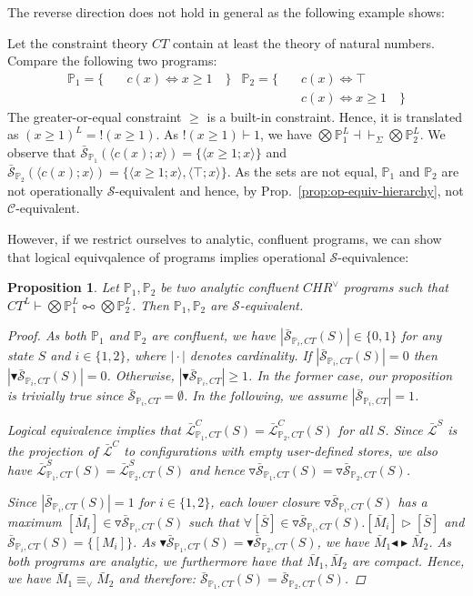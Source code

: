 \documentclass[acmtocl]{acmtrans2m}
\newtheorem{proposition}[theorem]{Proposition}
\newcommand\state[1]{\langle #1 \rangle}
\newcommand\ent{\rhd}
\renewcommand\sim{{\blacktriangleleft\blacktriangleright}}
\newcommand\equv{\equiv_\vee}
\newcommand{\bbP}{\ensuremath{\mathbb{P}}}
\newcommand{\cS}{\ensuremath{\mathcal{S}}}
\newcommand{\cC}{\ensuremath{\mathcal{C}}}
\newcommand{\bcS}{\ensuremath{\bar{\mathcal{S}}}}
\newcommand{\bcL}{\ensuremath{\bar{\mathcal{L}}}}
\newcommand{\bS}{\bar{S}}
\newcommand{\lpl}{\multimapboth}
\begin{document}
The reverse direction does not hold in general as the following example shows:

\begin{example}
Let the constraint theory $CT$ contain at least the theory of natural numbers.
Compare the following two programs:
\begin{align*}
  \bbP_1 = \{ & \quad c(x)\Leftrightarrow x\geq 1 \quad \}&
  	\bbP_2 = \{ & \quad c(x)\Leftrightarrow \top \\
  & & & \quad c(x)\Leftrightarrow x\geq 1 \quad \}
\end{align*}
The greater-or-equal constraint $\geq$ is a built-in constraint. Hence, it is
translated as $(x\geq 1)^L = !(x\geq 1)$. As $!(x\geq 1)\vdash 1$, we have
$\bigotimes\bbP^L_1\dashv\vdash_\Sigma\bigotimes\bbP^L_2$.
We observe that $\bcS_{\bbP_1}(\state{c(x);x})=\{\state{x\geq 1;x}\}$ and
$\bcS_{\bbP_2}(\state{c(x);x})=\{\state{x\geq 1;x},\state{\top;x}\}$. As the
sets are not equal, $\bbP_1$ and $\bbP_2$ are not operationally $\cS$-equivalent
and hence, by Prop.~\ref{prop:op-equiv-hierarchy}, not $\cC$-equivalent.
\end{example}

However, if we restrict ourselves to analytic, confluent
programs, we can show that logical equivqalence of programs implies operational
$\cS$-equivalence:

\begin{proposition}\label{prop:confl-impl-ll-equiv} Let $\bbP_1, \bbP_2$ be two
analytic confluent $CHR^\vee$ programs such that
$CT^L\vdash\bigotimes\bbP^L_1\lpl\bigotimes\bbP^L_2$.
Then $\bbP_1, \bbP_2$ are $\cS$-equivalent.
\begin{proof}
As both $\bbP_1$ and $\bbP_2$ are confluent, we have
$|\bcS_{\bbP_i,CT}(S)|\in\{0,1\}$ for any state $S$ and $i\in\{1,2\}$,
where $\mid\cdot\mid$ denotes cardinality. If $|\bcS_{\bbP_i,CT}(S)|=0$
then $|\blacktriangledown\bcS_{\bbP_i,CT}(S)|=0$. Otherwise,
$|\blacktriangledown\bcS_{\bbP_i,CT}|\geq 1$. In the former case, our
proposition is trivially true since $\bcS_{\bbP_i,CT}=\emptyset$. In the
following, we assume $|\bcS_{\bbP_i,CT}|=1$.

Logical equivalence implies that $\bcL^C_{\bbP_1,CT}(S)=\bcL^C_{\bbP_2,CT}(S)$
for all $S$. Since $\bcL^S$ is the projection of $\bcL^C$ to configurations with
empty user-defined stores, we also have
$\bcL^S_{\bbP_1,CT}(S)=\bcL^S_{\bbP_2,CT}(S)$ and hence
$\triangledown\bcS_{\bbP_1,CT}(S)=\triangledown\bcS_{\bbP_2,CT}(S)$.

Since $|\bcS_{\bbP_i,CT}(S)|=1$ for $i\in\{1,2\}$, each lower
closure $\triangledown\bcS_{\bbP_i,CT}(S)$ has a maximum
$[\bar M_i]\in\triangledown\bcS_{\bbP_i,CT}(S)$ such that $\forall
[\bS]\in\triangledown\bcS_{\bbP_i,CT}(S).[\bar M_i]\ent [\bS]$ and
$\bcS_{\bbP_i,CT}(S)=\{[M_i]\}$. As
$\blacktriangledown\bcS_{\bbP_1,CT}(S)=\blacktriangledown\bcS_{\bbP_2,CT}(S)$,
we have $\bar M_1\sim\bar M_2$. As both programs are analytic, we furthermore
have that $\bar M_1,\bar M_2$ are compact. Hence, we have $\bar M_1\equv\bar
M_2$ and therefore: $\bcS_{\bbP_1,CT}(S)=\bcS_{\bbP_2,CT}(S)$.
\end{proof}
\end{proposition}
\end{document}
